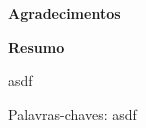 \documentclass[12pt, a4paper, twoside]{report}
\numberwithin{equation}{subsection} %
\begin{document}




\vspace*{2.5cm}

\begin{center}
 {\Huge \bfseries Agradecimentos}
\end{center}
\baselineskip 19.5pt 
\vspace*{1.5cm}


\newpage


\vspace*{2.5cm}
\begin{center}
 {\Huge \bfseries Resumo}
\end{center}
\baselineskip 19.5pt 
\vspace*{1.5cm}

asdf

\vspace*{1.5cm}

Palavras-chaves: asdf

  
\newpage



\listoftables
\end{document}
